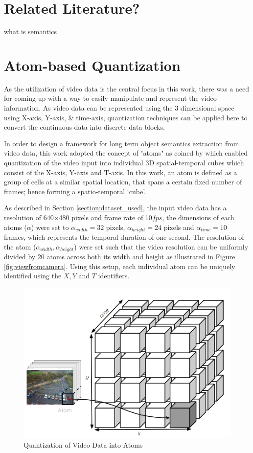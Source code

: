 \section{Related Literature?}

what is semantics


\section{Atom-based Quantization}
\label{section:atoms}

As the utilization of video data is the central focus in this work, there was a need for coming up with a way to easily manipulate and represent the video information. As video data can be  represented using the 3 dimensional space using X-axis, Y-axis, \& time-axis, quantization techniques can be applied here to convert the continuous data into discrete data blocks.     

In order to design a framework for long term object semantics extraction from video data, this work adopted the concept of "atoms" as coined by \cite{castanon2016retrieval} which enabled quantization of the video input into individual 3D spatial-temporal cubes which consist of the X-axis, Y-axis and T-axis. In this work, an atom is defined as a group of cells at a similar spatial location, that spans a certain fixed number of frames; hence forming a spatio-temporal `cube'.

As described in Section \ref{section:dataset_used}, the input video data has a resolution of 640$\times$480 pixels and frame rate of 10$fps$, the dimensions of each atoms ($\alpha$) were 
set to $\alpha_{width}=32$ pixels, $\alpha_{height}=24$ pixels and $\alpha_{time}=10$ frames, which represents the temporal duration of one second. The resolution of the atom ($\alpha_{width},\alpha_{height}$) were set such that the video resolution can be uniformly divided by 20 atoms across both its width and height as illustrated in Figure \ref{fig:viewfromcamera}. Using this setup, each individual atom can be uniquely identified using the $X, Y$ and $T$ identifiers. 



\begin{figure}[hbt!]\centering
\includegraphics[width=.7\textwidth]{image/general/atom.PNG}
\caption{Quantization of Video Data into Atoms}
\label{fig:atoms}
\end{figure}

